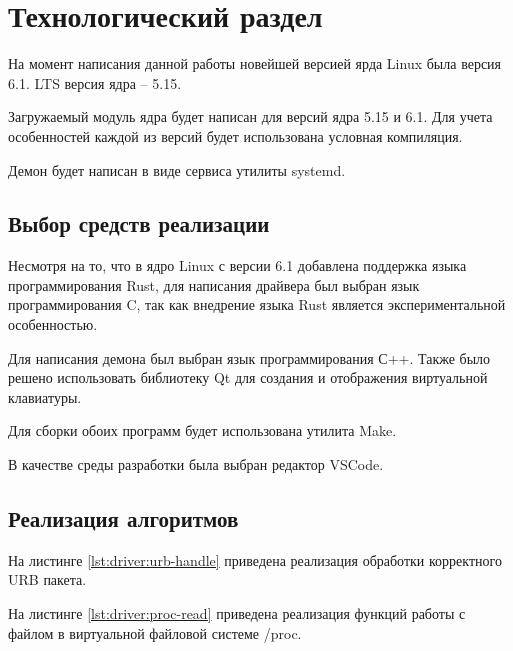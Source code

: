 \section{Технологический раздел}

На момент написания данной работы новейшей версией ярда Linux была версия 6.1. LTS версия ядра -- 5.15.

Загружаемый модуль ядра будет написан для версий ядра 5.15 и 6.1. Для учета особенностей каждой из версий будет использована условная компиляция.

Демон будет написан в виде сервиса утилиты systemd.

\subsection{Выбор средств реализации}

Несмотря на то, что в ядро Linux с версии 6.1 добавлена поддержка языка программирования Rust, для написания драйвера был выбран язык программирования C, так как внедрение языка Rust является экспериментальной особенностью.

Для написания демона был выбран язык программирования С++. Также было решено использовать библиотеку Qt для создания и отображения виртуальной клавиатуры.

Для сборки обоих программ будет использована утилита Make.

В качестве среды разработки была выбран редактор VSCode.

\clearpage

\subsection{Реализация алгоритмов}

На листинге \ref{lst:driver:urb-handle} приведена реализация обработки корректного URB пакета.


На листинге \ref{lst:driver:proc-read} приведена реализация функций работы с файлом в виртуальной файловой системе /proc.


